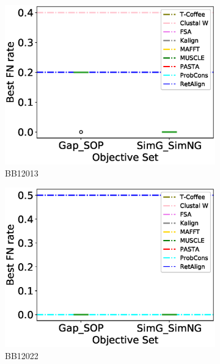 \begin{figure}[!htbp]
\begin{adjustwidth}{-1.5cm}{-1cm}
\begin{subfigure}{0.22\textwidth}
			\includegraphics[width=\columnwidth]{Figure/summary/precomputedInit/Balibase/BB12013_objset_fnrate_rank}
			\caption{BB12013}
		\end{subfigure}
		\begin{subfigure}{0.22\textwidth}
			\includegraphics[width=\columnwidth]{Figure/summary/precomputedInit/Balibase/BB12022_objset_fnrate_rank}
			\caption{BB12022}
		\end{subfigure}
		\begin{subfigure}{0.22\textwidth}

\end{subfigure}
\end{adjustwidth}
\end{figure}
